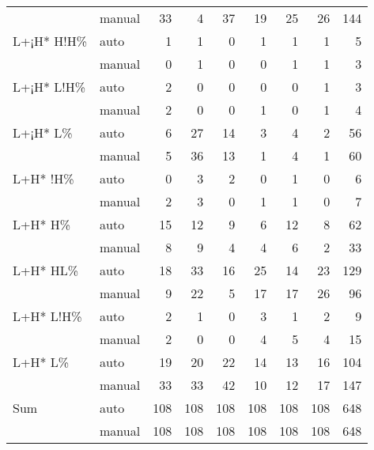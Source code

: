 \begin{longtable}{llrrrrrrr}
			& 			manual 		&33&4&37&19&25&26&144\\\addlinespace
	L+¡H* H!H\%&		auto		&1&1&0&1&1&1 & 5\\
 			&			manual 		&0&1&0&0&1&1&3\\\addlinespace
	L+¡H* L!H\%&		auto		&2&0&0&0&0&1 & 3\\
 			&			manual 		&2&0&0&1&0&1&4\\\addlinespace
	L+¡H* L\%&			auto		&6&27&14&3&4&2 & 56\\
 			&			manual 		&5&36&13&1&4&1&60\\\addlinespace
	L+H* !H\%&			auto		&0&3&2&0&1&0 & 6 \\
 			&			manual 		&2&3&0&1&1&0&7\\\addlinespace
	L+H* H\%&			auto		&15&12&9&6&12&8 & 62\\
 			&			manual 		&8&9&4&4&6&2&33\\\addlinespace
	L+H* HL\%&			auto		&18&33&16&25&14&23 & 129\\
 			&			manual 		&9&22&5&17&17&26&96\\\addlinespace
	L+H* L!H\%&			auto		&2&1&0&3&1&2 & 9\\
 			&			manual 		&2&0&0&4&5&4&15\\\addlinespace
	L+H* L\%&			auto		&19&20&22&14&13&16 & 104\\
 			&			manual 		&33&33&42&10&12&17&147\\\midrule
	Sum		&			auto 		&108&108&108&108&108&108 & 648\\
 			&			manual 		&108&108&108&108&108&108 & 648\\
\end{longtable}


